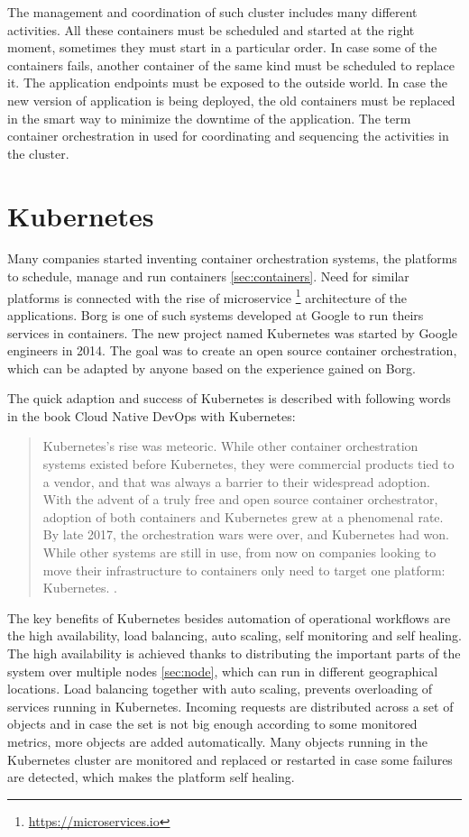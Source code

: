 \documentclass[
  digital, %
  twoside, %
  table,   %
  lof,     %
  lot,     %
]{fithesis3}
\begin{document}
The management and coordination of such cluster includes many different activities. All these containers must be scheduled and started at the right moment, sometimes they must start in a particular order. In case some of the containers fails, another container of the same kind must be scheduled to replace it. The application endpoints must be exposed to the outside world. In case the new version of application is being deployed, the old containers must be replaced in the smart way to minimize the downtime of the application. The term container orchestration in used for coordinating and sequencing the activities in the cluster.

\section{Kubernetes} \label{sec:k8s}
Many companies started inventing container orchestration systems, the platforms to schedule, manage and run containers \ref{sec:containers}. Need for similar platforms is connected with the rise of microservice \footnote{\url{https://microservices.io}} architecture of the applications. Borg \cite{borg} is one of such systems developed at Google to run theirs services in containers. The new project named Kubernetes was started by Google engineers in 2014. The goal was to create an open source container orchestration, which can be adapted by anyone based on the experience gained on Borg.

The quick adaption and success of Kubernetes is described with following words in the book Cloud Native DevOps with Kubernetes:
\begin{quote}
Kubernetes’s rise was meteoric. While other container orchestration systems existed
before Kubernetes, they were commercial products tied to a vendor, and that was
always a barrier to their widespread adoption. With the advent of a truly free and
open source container orchestrator, adoption of both containers and Kubernetes grew
at a phenomenal rate.
By late 2017, the orchestration wars were over, and Kubernetes had won. While other
systems are still in use, from now on companies looking to move their infrastructure
to containers only need to target one platform: Kubernetes. \cite{k8s, p. 11}.
\end{quote}

The key benefits of Kubernetes \cite{k8s_features} besides automation of operational workflows are the high availability, load balancing, auto scaling, self monitoring and self healing. The high availability is achieved thanks to distributing the important parts of the system over multiple nodes \ref{sec:node}, which can run in different geographical locations. Load balancing together with auto scaling, prevents overloading of services running in Kubernetes. Incoming requests are distributed across a set of objects and in case the set is not big enough according to some monitored metrics, more objects are added automatically. Many objects running in the Kubernetes cluster are monitored and replaced or restarted in case some failures are detected, which makes the platform self healing.
\end{document}
